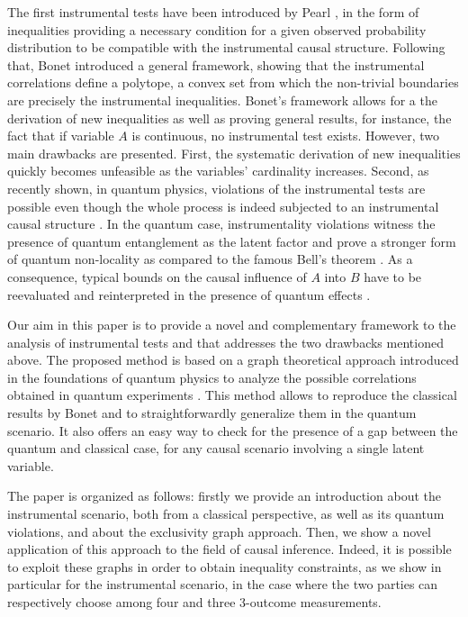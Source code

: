 \documentclass[letterpaper]{article}
\begin{document}
The first instrumental tests have been introduced by Pearl \cite{pearl1995}, in
the form of inequalities providing a necessary condition for a given observed
probability distribution to be compatible with the instrumental causal
structure. Following that, Bonet \cite{bonet2001} introduced a general
framework, showing that the instrumental correlations define a polytope, a
convex set from which the non-trivial boundaries are precisely the instrumental
inequalities. Bonet's framework allows for a the derivation of new inequalities
as well as proving general results, for instance, the fact that if variable $A$
is continuous, no instrumental test exists. However, two main drawbacks are
presented. First, the systematic derivation of new inequalities quickly becomes
unfeasible as the variables' cardinality increases. Second, as recently shown,
in quantum physics, violations of the instrumental tests are possible even
though the whole process is indeed subjected to an instrumental causal structure
\cite{chaves2018, himbeeck2018}. In the quantum case, instrumentality violations
witness the presence of quantum entanglement as the latent factor and prove a
stronger form of quantum non-locality as compared to the famous Bell's theorem
\cite{chaves2018}. As a consequence, typical bounds on the causal influence of
$A$ into $B$ have to be reevaluated and reinterpreted in the presence of quantum
effects \cite{}.

Our aim in this paper is to provide a novel and complementary framework to the
analysis of instrumental tests and that addresses the two drawbacks mentioned
above. The proposed method is based on a graph theoretical approach introduced
in the foundations of quantum physics to analyze the possible correlations
obtained in quantum experiments \cite{}. %
This method allows to reproduce the classical results by Bonet and to
straightforwardly generalize them in the quantum scenario. 
It also offers an easy way to check for the presence of a gap between the
quantum and classical case, for any causal scenario involving a single latent
variable.

The paper is organized as follows: firstly we provide an introduction about the
instrumental scenario, both from a classical perspective, as well as its quantum
violations, and about the exclusivity graph approach. Then, we show a novel
application of this approach to the field of causal inference.
Indeed, it is possible to exploit these graphs in order to obtain inequality
constraints, as we show in particular for the instrumental scenario, in the case
where the two parties can respectively choose among four and three 3-outcome
measurements.
\end{document}

